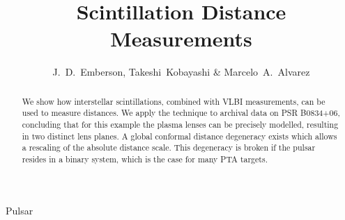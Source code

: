 \documentclass{emulateapj}
\begin{document}
\title[Lensing Distance]{
Scintillation Distance Measurements
}

\author{J.~D.~Emberson, Takeshi~Kobayashi \& Marcelo~A.~Alvarez}






\begin{abstract}
We show how interstellar scintillations, combined with VLBI
measurements, can be used to measure distances.  
We apply the technique to archival data on PSR
B0834+06, concluding that for this example the plasma lenses can be
precisely modelled, resulting in two distinct lens planes.  A global
conformal distance degeneracy exists which allows a rescaling of the
absolute distance scale.  This degeneracy is broken if the pulsar resides in a
binary system, which is the case for many PTA targets.
\end{abstract}
\begin{keywords}
Pulsar
\end{keywords}
\end{document}
